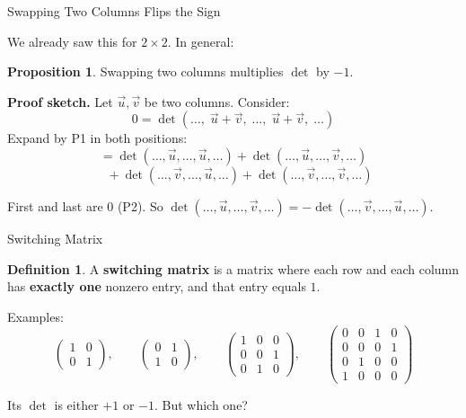 \documentclass[10pt]{beamer}
\theoremstyle{definition}
\newtheorem{defi}{Definition}[section]
\newtheorem{prop}{Proposition}[section]
\newcommand{\x}[1]{\alert{\textbf{#1}}}
\begin{document}
\begin{frame}{Swapping Two Columns Flips the Sign}

We already saw this for $2\times 2$. In general:

\begin{prop}
Swapping two columns multiplies $\det$ by $-1$.
\end{prop}

\vfill
\pause

\textbf{Proof sketch.} Let $\vec{u},\vec{v}$ be two columns. Consider:
$$
0 = \det(\ldots,\; \vec{u}+\vec{v},\; \ldots,\; \vec{u}+\vec{v},\; \ldots)
$$
Expand by P1 in both positions:
$$
= \det(\ldots,\vec{u},\ldots,\vec{u},\ldots) + \det(\ldots,\vec{u},\ldots,\vec{v},\ldots)
$$
$$
\quad + \det(\ldots,\vec{v},\ldots,\vec{u},\ldots) + \det(\ldots,\vec{v},\ldots,\vec{v},\ldots)
$$

First and last are $0$ (P2). So $\det(\ldots,\vec{u},\ldots,\vec{v},\ldots) = -\det(\ldots,\vec{v},\ldots,\vec{u},\ldots)$.

\end{frame}


\begin{frame}{Switching Matrix}

\begin{defi}
A \x{switching matrix} is a matrix where each row and each column has \x{exactly one} nonzero entry, and that entry equals $1$.
\end{defi}

\vfill

Examples:
$$
\begin{pmatrix} 1 & 0 \\ 0 & 1 \end{pmatrix}, \qquad
\begin{pmatrix} 0 & 1 \\ 1 & 0 \end{pmatrix}, \qquad
\begin{pmatrix} 1 & 0 & 0 \\ 0 & 0 & 1 \\ 0 & 1 & 0 \end{pmatrix}, \qquad
\begin{pmatrix} 0 & 0 & 1 & 0 \\ 0 & 0 & 0 & 1 \\ 0 & 1 & 0 & 0 \\ 1 & 0 & 0 & 0 \end{pmatrix}
$$

\vfill

Its $\det$ is either $+1$ or $-1$. But which one?

\end{frame}
\end{document}
